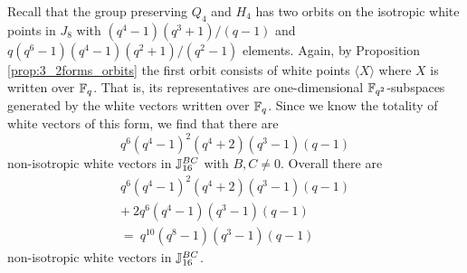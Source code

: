 Recall that the group preserving $Q_4$ and $H_4$ has two orbits on the isotropic white
points in $J_8$ with
$(q^4-1)(q^3+1)/(q-1)$ and $q(q^6-1)(q^4-1)(q^2+1)/(q^2-1)$ elements. Again, by Proposition \ref{prop:3_2forms_orbits} the first orbit
consists of white points
$\langle X \rangle$ where $X$ is written over $\mathbb{F}_q$. That is, its representatives are
one-dimensional $\mathbb{F}_{q^2}$-subspaces generated by the white vectors written over $\mathbb{F}_q$.
Since we know the totality of white vectors of this form, we find that there are
\begin{equation}
	q^6(q^4-1)^2(q^4+2)(q^3-1)(q-1)
\end{equation}
non-isotropic white vectors in $\mathbb{J}_{16}^{BC}$ with $B,C\neq 0$. Overall there are
\begin{multline}
	q^6(q^4-1)^2(q^4+2)(q^3-1)(q-1)\\
	+\ 2q^6(q^4-1)(q^3-1)(q-1)\\
	=\ q^{10}(q^8-1)(q^3-1)(q-1)
\end{multline}
non-isotropic white vectors in $\mathbb{J}_{16}^{BC}$.